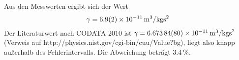 Aus den Messwerten ergibt sich der Wert
\begin{align}
\gamma=\SI[per-mode = fraction]{6,9\pm0,2e-11}{\m^{3}\per\kg\s\squared}
\end{align}
Der Literaturwert nach CODATA 2010 ist $\gamma=\SI[per-mode = fraction]{6,67384\pm0,00080e-11}{\m^{3}\per\kg\s\squared}$ (Verweis auf http://physics.nist.gov/cgi-bin/cuu/Value?bg), liegt also knapp außerhalb des Fehlerintervalls. Die Abweichung beträgt $\SI{3,4}{\percent}$.

